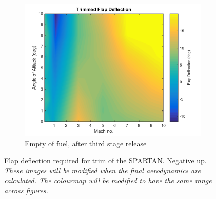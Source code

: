 \begin{figure}
\begin{subfigure}{.5\textwidth}
				\centering
				\includegraphics[width=0.99\linewidth]{figures/3_vehicle_design/FlapDeflection}
				\caption{Empty of fuel, after third stage release}
				\label{fig:FlapDeflectionEngineOff}
			\end{subfigure}
			\caption{Flap deflection required for trim of the SPARTAN. Negative up. \textit{These images will be modified when the final aerodynamics are calculated. The colourmap will be modified to have the same range across figures.}}
			\label{fig:FlapDeflection}
		\end{figure}
		
		
		
		
		
		
